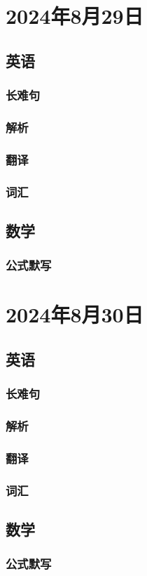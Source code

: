 \documentclass[UTF8]{ctexart}
\begin{document}
\section{2024年8月29日}
\subsection{英语}
\subsubsection{长难句}
\subsubsection{解析}
\subsubsection{翻译}
\subsubsection{词汇}
\subsection{数学}
\subsubsection{公式默写}
\begin{multicols}{2}
\end{multicols}
\section{2024年8月30日}
\subsection{英语}
\subsubsection{长难句}
\subsubsection{解析}
\subsubsection{翻译}
\subsubsection{词汇}
\subsection{数学}
\subsubsection{公式默写}
\begin{multicols}{2}
\end{multicols}
\end{document}
